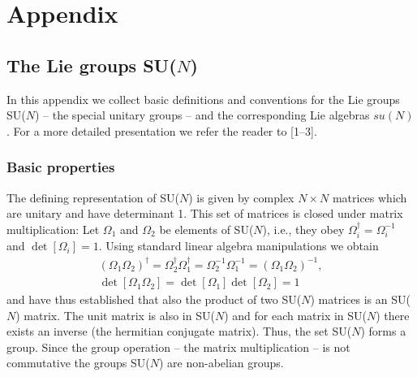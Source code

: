 
\chapter{Appendix}

\section{The Lie groups SU($N$)}

In this appendix we collect basic definitions and conventions for the Lie
groups SU($N$) -- the special unitary groups -- and the corresponding Lie
algebras $su(N)$. For a more detailed presentation we refer the reader to
[1--3].

\subsection{Basic properties}

The defining representation of SU($N$) is given by complex $N\times N$
matrices which are unitary and have determinant 1. This set of matrices is
closed under matrix multiplication: Let $\Omega_1$ and $\Omega_2$ be elements
of SU($N$), i.e., they obey $\Omega_i^\dagger = \Omega_i^{-1}$ and
$\det[\Omega_i] = 1$. Using standard linear algebra manipulations we obtain
\begin{equation}
  \begin{gathered}
    (\Omega_1\Omega_2)^\dagger = \Omega_2^\dagger\Omega_1^\dagger
    = \Omega_2^{-1}\Omega_1^{-1} = (\Omega_1\Omega_2)^{-1},\\[2pt]
    \det[\Omega_1\Omega_2] = \det[\Omega_1]\det[\Omega_2] = 1
  \end{gathered}
\end{equation}
and have thus established that also the product of two SU($N$) matrices is an
SU($N$) matrix. The unit matrix is also in SU($N$) and for each matrix in
SU($N$) there exists an inverse (the hermitian conjugate matrix). Thus, the
set SU($N$) forms a group. Since the group operation -- the matrix
multiplication -- is not commutative the groups SU($N$) are non-abelian
groups.

